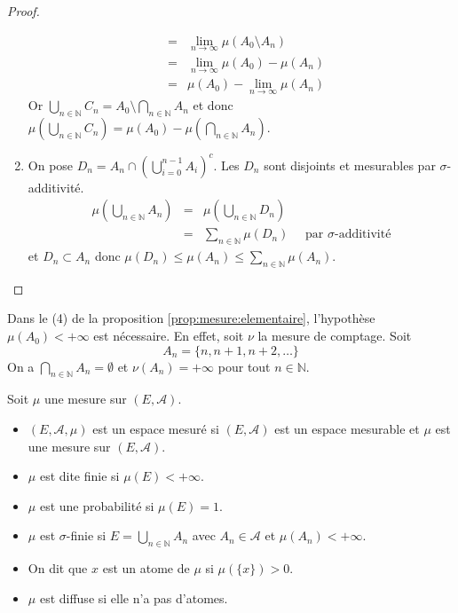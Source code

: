\begin{proof}
\begin{enumerate}
\begin{eqnarray*}
			      &=& \lim\limits_{n \to \infty} \mu(A_0\setminus A_n) \\
			      &=& \lim\limits_{n \to \infty} \mu(A_0) - \mu(A_n) \\
			      &=& \mu(A_0) - \lim\limits_{n \to \infty} \mu(A_n)
		      \end{eqnarray*}
		      Or $\bigcup\limits_{n \in \mathbb{N}} C_n = A_0 \setminus \bigcap\limits_{n \in \mathbb{N}} A_n$ et donc
		      $\mu(\bigcup\limits_{n \in \mathbb{N}} C_n) = \mu(A_0) - \mu(\bigcap\limits_{n \in \mathbb{N}} A_n)$.
		\item On pose $D_n = A_n \cap \left( \bigcup\limits_{i=0}^{n-1} A_i \right)^c$. Les $D_n$ sont disjoints et mesurables par
		      $\sigma$-additivité.
		      \begin{eqnarray*}
			      \mu(\bigcup\limits_{n \in \mathbb{N}} A_n) &=& \mu(\bigcup\limits_{n \in \mathbb{N}} D_n) \\
			      &=& \sum\limits_{n \in \mathbb{N}} \mu(D_n) \quad \text{ par } \sigma\text{-additivité}
		      \end{eqnarray*}
		      et $D_n \subset A_n$ donc $\mu(D_n) \leq \mu(A_n) \leq \sum\limits_{n \in \mathbb{N}} \mu(A_n)$.
	\end{enumerate}
\end{proof}

\begin{remarque}
	Dans le (4) de la proposition \ref{prop:mesure:elementaire}, l'hypothèse $\mu(A_0) < +\infty$ est nécessaire. En effet, soit
	$\nu$ la mesure de comptage. Soit
	\[ A_n = \{ n, n+1, n+2, \dots \} \]
	On a $\bigcap\limits_{n \in \mathbb{N}} A_n = \emptyset$ et $\nu(A_n) = +\infty$ pour tout $n \in \mathbb{N}$.
\end{remarque}

\begin{definition}
	Soit $\mu$ une mesure sur $(E, \mathscr{A})$.
	\begin{itemize}
		\item $(E, \mathscr{A}, \mu)$ est un espace mesuré si $(E,\mathscr{A})$ est un espace mesurable et $\mu$ est une mesure sur $ (E, \mathscr{A} ) $.
		\item $\mu$ est dite finie si $\mu(E) < +\infty$.
		\item $\mu$ est une probabilité si $\mu(E) = 1$.
		\item $\mu$ est $\sigma$-finie si $E = \bigcup\limits_{n \in \mathbb{N}} A_n$ avec $A_n \in \mathscr{A}$ et $\mu(A_n) < +\infty$.
		\item On dit que $x$ est un atome de $\mu$ si $\mu(\{x\}) > 0$.
		\item $\mu$ est diffuse si elle n'a pas d'atomes.
	\end{itemize}
\end{definition}
